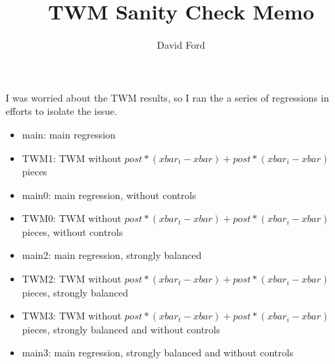 \documentclass[11pt,a4paper]{article}
\begin{document}
\title{TWM Sanity Check Memo}
\author{David Ford}
\maketitle

I was worried about the TWM results, so I ran the a series of regressions in efforts to isolate the issue. \\

\begin{itemize}
	\item main: main regression
	\item TWM1: TWM without $post*(xbar_t - xbar) + post*(xbar_i - xbar)$ pieces

	\item main0: main regression, without controls
	\item TWM0: TWM without $post*(xbar_t - xbar) + post*(xbar_i - xbar)$ pieces, without controls

	\item main2: main regression, strongly balanced
	\item TWM2: TWM without $post*(xbar_t - xbar) + post*(xbar_i - xbar)$ pieces, strongly balanced

	\item TWM3: TWM without $post*(xbar_t - xbar) + post*(xbar_i - xbar)$ pieces, strongly balanced and without controls
	\item main3: main regression, strongly balanced and without controls
\end{itemize}



\newpage 
\begin{center}

\end{center}

\begin{center}

\end{center}

\newpage 
\begin{center}

\end{center}

\begin{center}

\end{center}



\newpage 
\begin{center}

\end{center}
\end{document}
